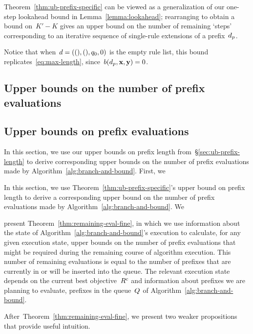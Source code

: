 Theorem~\ref{thm:ub-prefix-specific} can be viewed as a generalization
of our one-step lookahead bound in Lemma~\ref{lemma:lookahead};
rearranging to obtain a bound on~${K' - K}$
gives an upper bound on the number of remaining `steps' corresponding
to an iterative sequence of single-rule extensions of a prefix~$d_p$.
%
\begin{arxiv}
Notice that when~${{d} = ((), (), q_0, 0)}$ is the empty rule list,
this bound replicates~\eqref{eq:max-length}, since~${b(d_p, \mathbf{x}, \mathbf{y}) = 0}$.
\end{arxiv}

\begin{arxiv}
\subsection{Upper bounds on the number of prefix evaluations}
\end{arxiv}
\begin{kdd}
\subsection{Upper bounds on prefix evaluations}
\end{kdd}
\label{sec:ub-size}

\begin{arxiv}
In this section, we use our upper bounds on prefix length
from~\S\ref{sec:ub-prefix-length} to derive corresponding
upper bounds on the number of prefix evaluations made by
Algorithm~\ref{alg:branch-and-bound}.
%
First, we
\end{arxiv}
\begin{kdd}
In this section, we use Theorem~\ref{thm:ub-prefix-specific}'s
upper bound on prefix length to derive a corresponding
upper bound on the number of prefix evaluations made by
Algorithm~\ref{alg:branch-and-bound}.
%
We
\end{kdd}
present Theorem~\ref{thm:remaining-eval-fine},
in which we use information about the state of
Algorithm~\ref{alg:branch-and-bound}'s execution
to calculate, for any given execution state,
upper bounds on the number of prefix evaluations that might
be required during the remaining course of algorithm execution.
%
This number of remaining evaluations is equal to the number of
prefixes that are currently in or will be inserted into the queue.
%
The relevant execution state depends on the current
best objective~${R^c}$ and information about
prefixes we are planning to evaluate, \ie prefixes in the
queue~$Q$ of Algorithm~\ref{alg:branch-and-bound}.
%
\begin{arxiv}
After~Theorem~\ref{thm:remaining-eval-fine}, we present two
weaker propositions that provide useful intuition.
\end{arxiv}

